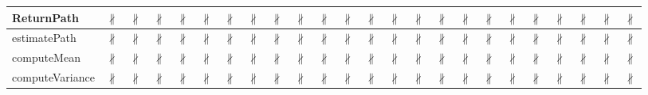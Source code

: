 \documentclass[10pt]{article}
\begin{document}
\begin{longtable}{|l|l|l|l|l|l|l|l|l|l|l|l|l|l|l|l|l|l|l|l|l|l|l|l|}
\hline
ReturnPath&{\color{BrickRed}$\nparallel$}&{\color{BrickRed}$\nparallel$}&{\color{BrickRed}$\nparallel$}&{\color{BrickRed}$\nparallel$}&{\color{BrickRed}$\nparallel$}&{\color{BrickRed}$\nparallel$}&{\color{BrickRed}$\nparallel$}&{\color{BrickRed}$\nparallel$}&{\color{BrickRed}$\nparallel$}&{\color{BrickRed}$\nparallel$}&{\color{BrickRed}$\nparallel$}&{\color{BrickRed}$\nparallel$}&{\color{BrickRed}$\nparallel$}&{\color{BrickRed}$\nparallel$}&{\color{BrickRed}$\nparallel$}&{\color{BrickRed}$\nparallel$}&{\color{BrickRed}$\nparallel$}&{\color{BrickRed}$\nparallel$}&{\color{BrickRed}$\nparallel$}&{\color{BrickRed}$\nparallel$}&{\color{BrickRed}$\nparallel$}&{\color{BrickRed}$\nparallel$}&{\color{BrickRed}$\nparallel$}\\
\hline
estimatePath&{\color{BrickRed}$\nparallel$}&{\color{BrickRed}$\nparallel$}&{\color{BrickRed}$\nparallel$}&{\color{BrickRed}$\nparallel$}&{\color{BrickRed}$\nparallel$}&{\color{BrickRed}$\nparallel$}&{\color{BrickRed}$\nparallel$}&{\color{BrickRed}$\nparallel$}&{\color{BrickRed}$\nparallel$}&{\color{BrickRed}$\nparallel$}&{\color{BrickRed}$\nparallel$}&{\color{BrickRed}$\nparallel$}&{\color{BrickRed}$\nparallel$}&{\color{BrickRed}$\nparallel$}&{\color{BrickRed}$\nparallel$}&{\color{BrickRed}$\nparallel$}&{\color{BrickRed}$\nparallel$}&{\color{BrickRed}$\nparallel$}&{\color{BrickRed}$\nparallel$}&{\color{BrickRed}$\nparallel$}&{\color{BrickRed}$\nparallel$}&{\color{BrickRed}$\nparallel$}&{\color{BrickRed}$\nparallel$}\\
\hline
computeMean&{\color{BrickRed}$\nparallel$}&{\color{BrickRed}$\nparallel$}&{\color{BrickRed}$\nparallel$}&{\color{BrickRed}$\nparallel$}&{\color{BrickRed}$\nparallel$}&{\color{BrickRed}$\nparallel$}&{\color{BrickRed}$\nparallel$}&{\color{BrickRed}$\nparallel$}&{\color{BrickRed}$\nparallel$}&{\color{BrickRed}$\nparallel$}&{\color{BrickRed}$\nparallel$}&{\color{BrickRed}$\nparallel$}&{\color{BrickRed}$\nparallel$}&{\color{BrickRed}$\nparallel$}&{\color{BrickRed}$\nparallel$}&{\color{BrickRed}$\nparallel$}&{\color{BrickRed}$\nparallel$}&{\color{BrickRed}$\nparallel$}&{\color{BrickRed}$\nparallel$}&{\color{BrickRed}$\nparallel$}&{\color{BrickRed}$\nparallel$}&{\color{BrickRed}$\nparallel$}&{\color{BrickRed}$\nparallel$}\\
\hline
computeVariance&{\color{BrickRed}$\nparallel$}&{\color{BrickRed}$\nparallel$}&{\color{BrickRed}$\nparallel$}&{\color{BrickRed}$\nparallel$}&{\color{BrickRed}$\nparallel$}&{\color{BrickRed}$\nparallel$}&{\color{BrickRed}$\nparallel$}&{\color{BrickRed}$\nparallel$}&{\color{BrickRed}$\nparallel$}&{\color{BrickRed}$\nparallel$}&{\color{BrickRed}$\nparallel$}&{\color{BrickRed}$\nparallel$}&{\color{BrickRed}$\nparallel$}&{\color{BrickRed}$\nparallel$}&{\color{BrickRed}$\nparallel$}&{\color{BrickRed}$\nparallel$}&{\color{BrickRed}$\nparallel$}&{\color{BrickRed}$\nparallel$}&{\color{BrickRed}$\nparallel$}&{\color{BrickRed}$\nparallel$}&{\color{BrickRed}$\nparallel$}&{\color{BrickRed}$\nparallel$}&{\color{BrickRed}$\nparallel$}\\

\end{longtable}
\end{document}
